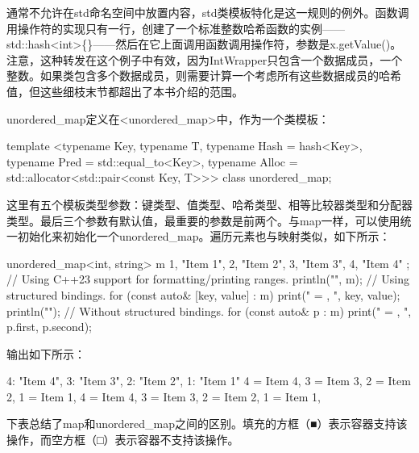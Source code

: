 通常不允许在std命名空间中放置内容，std类模板特化是这一规则的例外。函数调用操作符的实现只有一行，创建了一个标准整数哈希函数的实例——std::hash<int>\{\}——然后在它上面调用函数调用操作符，参数是x.getValue()。注意，这种转发在这个例子中有效，因为IntWrapper只包含一个数据成员，一个整数。如果类包含多个数据成员，则需要计算一个考虑所有这些数据成员的哈希值，但这些细枝末节都超出了本书介绍的范围。


unordered\_map定义在<unordered\_map>中，作为一个类模板：

\begin{cpp}
template <typename Key,
          typename T,
          typename Hash = hash<Key>,
          typename Pred = std::equal_to<Key>,
          typename Alloc = std::allocator<std::pair<const Key, T>>>
    class unordered_map;
\end{cpp}

这里有五个模板类型参数：键类型、值类型、哈希类型、相等比较器类型和分配器类型。最后三个参数有默认值，最重要的参数是前两个。与map一样，可以使用统一初始化来初始化一个unordered\_map。遍历元素也与映射类似，如下所示：

\begin{cpp}
unordered_map<int, string> m {
    {1, "Item 1"}, {2, "Item 2"}, {3, "Item 3"}, {4, "Item 4"}
};
// Using C++23 support for formatting/printing ranges.
println("{}", m);
// Using structured bindings.
for (const auto& [key, value] : m) { print("{} = {}, ", key, value); }
println("");
// Without structured bindings.
for (const auto& p : m) { print("{} = {}, ", p.first, p.second); }
\end{cpp}

输出如下所示：

\begin{shell}
{4: "Item 4", 3: "Item 3", 2: "Item 2", 1: "Item 1"}
4 = Item 4, 3 = Item 3, 2 = Item 2, 1 = Item 1,
4 = Item 4, 3 = Item 3, 2 = Item 2, 1 = Item 1,
\end{shell}

下表总结了map和unordered\_map之间的区别。填充的方框（■）表示容器支持该操作，而空方框（□）表示容器不支持该操作。

